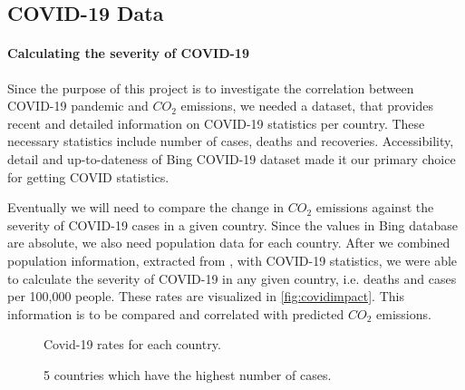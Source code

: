 \subsection{COVID-19 Data}
\paragraph{Calculating the severity of COVID-19}

Since the purpose of this project is to investigate the correlation between COVID-19 pandemic and  $CO_2$ emissions, we needed a dataset, that provides recent and detailed information on COVID-19 statistics per country. These necessary statistics include number of cases, deaths and recoveries. Accessibility, detail and up-to-dateness of Bing COVID-19 dataset \cite{Bing} made it our primary choice for getting COVID statistics.

Eventually we will need to compare the change in $CO_2$ emissions against the severity of COVID-19 cases in a given country. Since the values in Bing database are absolute, we also need population data for each country. After we combined population information, extracted from \cite{PopulationData}, with COVID-19 statistics, we were able to calculate the severity of COVID-19 in any given country, i.e. deaths and cases per 100,000 people. These rates are visualized in \autoref{fig:covidimpact}. This information is to be compared and correlated with predicted $CO_2$ emissions.

\begin{figure}[h]
	\centering
	\caption{Covid-19 rates for each country.}
	\label{fig:covidimpact}
\end{figure}


\begin{figure}[h]
	\centering
	\caption{5 countries which have the highest number of cases.}
	\label{fig:bingtop5}
\end{figure}
